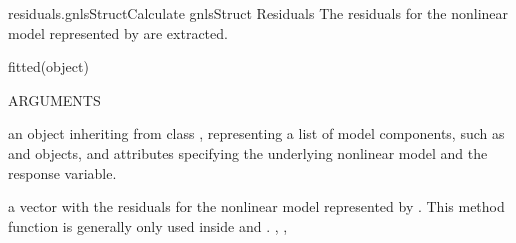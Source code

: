 \documentclass[pdftex]{article} \usepackage{url,graphicx}
\begin{document}
\begin{Helpfile}{residuals.gnlsStruct}{Calculate gnlsStruct Residuals}
The residuals for the nonlinear model represented by 
are extracted.
\begin{Example}
fitted(object)
\end{Example}
\begin{Argument}{ARGUMENTS}
\item[\Co{object:}]
an object inheriting from class ,
representing a list of model components, such as
 and  objects, and attributes
specifying the underlying nonlinear model and the response variable.
\end{Argument}
a vector with the residuals for the nonlinear model represented by
.
 This method function is generally only used inside  and 
.
, ,
\end{Helpfile}
\end{document}
